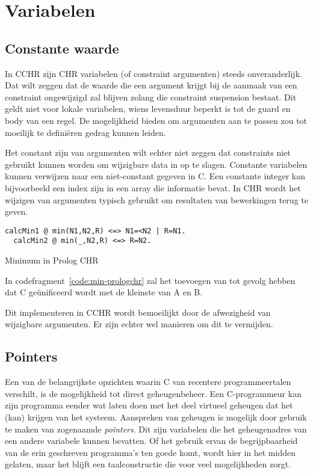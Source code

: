 \section{Variabelen} \label{sec:taal-var}

\subsection{Constante waarde}

In CCHR zijn CHR variabelen (of constraint argumenten) steeds onveranderlijk. Dat wilt zeggen dat de waarde die een argument krijgt bij de aanmaak van een constraint ongewijzigd zal blijven zolang die constraint suspension bestaat. Dit geldt niet voor lokale variabelen, wiens levensduur beperkt is tot de guard en body van een regel. De mogelijkheid bieden om argumenten aan te passen zou tot moeilijk te defini\"eren gedrag kunnen leiden.

Het constant zijn van argumenten wilt echter niet zeggen dat constraints niet gebruikt kunnen worden om wijzigbare data in op te slagen. Constante variabelen kunnen verwijzen naar een niet-constant gegeven in C. Een constante integer kan bijvoorbeeld een index zijn in een array die informatie bevat. In CHR wordt het wijzigen van argumenten typisch gebruikt om resultaten van bewerkingen terug te geven.
\begin{exCode}
\begin{Verbatim}[frame=single]
  calcMin1 @ min(N1,N2,R) <=> N1=<N2 | R=N1.
  calcMin2 @ min(_,N2,R) <=> R=N2.
\end{Verbatim}
\caption{Minimum in Prolog CHR}
\label{code:min-prologchr}
\end{exCode}
In codefragment~\ref{code:min-prologchr} zal het toevoegen van  tot gevolg hebben dat C ge\"unificeerd wordt met de kleinste van A en B.

Dit implementeren in CCHR wordt bemoeilijkt door de afwezigheid van wijzigbare argumenten. Er zijn echter wel manieren om dit te vermijden.

\subsection{Pointers}

Een van de belangrijkste opzichten waarin C van recentere programmeertalen verschilt, is de mogelijkheid tot direct geheugenbeheer. Een C-programmeur kan zijn programma eender wat laten doen met het deel virtueel geheugen dat het (kan) krijgen van het systeem. Aanspreken van geheugen is mogelijk door gebruik te maken van zogenaamde {\em pointers}. Dit zijn variabelen die het geheugenadres van een andere variabele kunnen bevatten. Of het gebruik ervan de begrijpbaarheid van de erin geschreven programma's ten goede komt, wordt hier in het midden gelaten, maar het blijft een taalconstructie die voor veel mogelijkheden zorgt.

